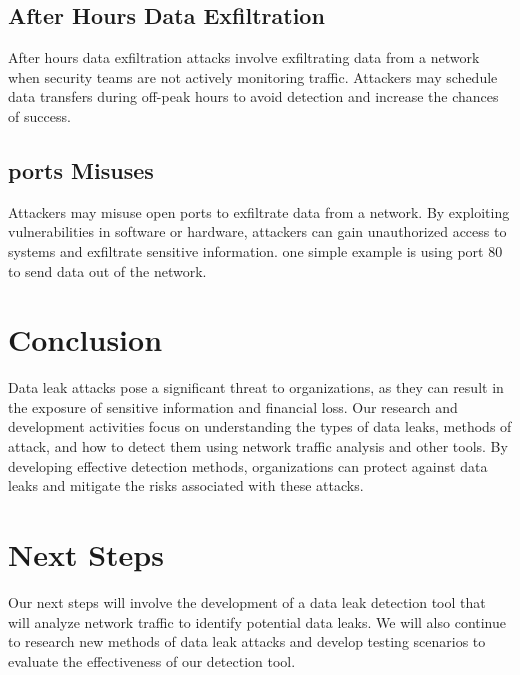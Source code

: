 \documentclass{article}
\begin{document}
\subsection{After Hours Data Exfiltration}
After hours data exfiltration attacks involve exfiltrating data from a network when security teams are not actively monitoring traffic. Attackers may schedule data transfers during off-peak hours to avoid detection and increase the chances of success.

\subsection{ports Misuses}
Attackers may misuse open ports to exfiltrate data from a network. By exploiting vulnerabilities in software or hardware, attackers can gain unauthorized access to systems and exfiltrate sensitive information. one simple example is using port 80 to send data out of the network.


\section{Conclusion}
Data leak attacks pose a significant threat to organizations, as they can result in the exposure of sensitive information and financial loss. Our research and development activities focus on understanding the types of data leaks, methods of attack, and how to detect them using network traffic analysis and other tools. By developing effective detection methods, organizations can protect against data leaks and mitigate the risks associated with these attacks.

\section{Next Steps}
Our next steps will involve the development of a data leak detection tool that will analyze network traffic to identify potential data leaks. We will also continue to research new methods of data leak attacks and develop testing scenarios to evaluate the effectiveness of our detection tool.
\end{document}
